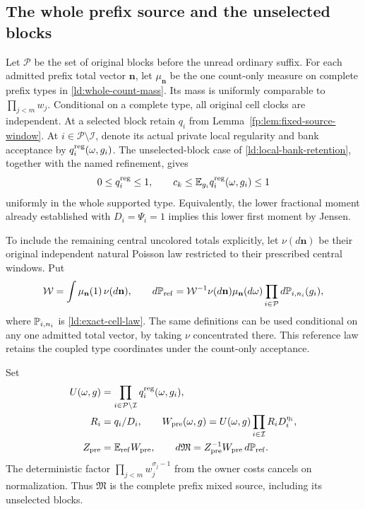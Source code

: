 \subsection{The whole prefix source and the unselected blocks}

Let $\mathcal P$ be the set of original blocks before the unread
ordinary suffix. For each admitted prefix total vector $\mathbf n$,
let $\mu_{\mathbf n}$ be the one count-only measure on complete
prefix types in \eqref{ld:whole-count-mass}. Its mass is uniformly
comparable to $\prod_{j<m}w_j$. Conditional on a complete type,
all original cell clocks are independent. At a selected block retain
$q_i$ from Lemma~\ref{fp:lem:fixed-source-window}. At
$i\in\mathcal P\setminus\mathcal I$, denote its actual private
local regularity and bank acceptance by $q_i^{\rm reg}(\omega,g_i)$.
The unselected-block case of \eqref{ld:local-bank-retention},
together with the named refinement, gives
\begin{equation}
 0\le q_i^{\rm reg}\le1,\qquad
 c_k\le\mathbb E_{g_i}q_i^{\rm reg}(\omega,g_i)\le1
 \label{fp:eq:unselected-mass}
\end{equation}
uniformly in the whole supported type. Equivalently, the lower
fractional moment already established with $D_i=\Psi_i=1$ implies
this lower first moment by Jensen.

To include the remaining central uncolored totals explicitly, let
$\nu(d\mathbf n)$ be their original independent natural Poisson
law restricted to their prescribed central windows. Put
\begin{equation}
 \mathcal W=\int\mu_{\mathbf n}(1)\,\nu(d\mathbf n),\qquad
 d\mathbb P_{\rm ref}
 =\mathcal W^{-1}\nu(d\mathbf n)\mu_{\mathbf n}(d\omega)
       \prod_{i\in\mathcal P}d\mathbb P_{i,n_i}(g_i),
 \label{fp:eq:source-reference}
\end{equation}
where $\mathbb P_{i,n_i}$ is \eqref{ld:exact-cell-law}. The same
definitions can be used conditional on any one admitted total
vector, by taking $\nu$ concentrated there. This reference law
retains the coupled type coordinates under the count-only acceptance.

Set
\begin{equation}
 \begin{split}
 U(\omega,g)&=\prod_{i\in\mathcal P\setminus\mathcal I}
                      q_i^{\rm reg}(\omega,g_i),\\
 R_i&=q_i/D_i,\qquad
 W_{\rm pre}(\omega,g)
       =U(\omega,g)\prod_{i\in\mathcal I}R_iD_i^{\eta_i},\\
 Z_{\rm pre}&=\mathbb E_{\rm ref}W_{\rm pre},\qquad
 d\mathfrak M=Z_{\rm pre}^{-1}W_{\rm pre}\,d\mathbb P_{\rm ref}.
 \end{split}
 \label{fp:eq:source-weight}
\end{equation}
The deterministic factor $\prod_{j<m}w_j^{\sigma_j-1}$ from
the owner costs cancels on normalization. Thus $\mathfrak M$ is
the complete prefix mixed source, including its unselected blocks.

